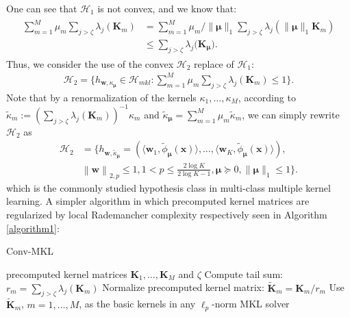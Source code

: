 \documentclass{article}
\begin{document}
One can see that $\mathcal{H}_{1}$ is not convex, and we know that:
\begin{align*}
    \begin{aligned}
        \sum_{m=1}^M\mu_m\sum_{j>\zeta}\lambda_{j}(\mathbf{K}_m)
        & =\sum_{m=1}^M\mu_m/\|\bm \mu\|_1 \sum_{j>\zeta}\lambda_{j}(\|\bm \mu\|_1\mathbf{K}_m)\\
        & \leq \sum_{j>\zeta} \lambda_j\big(\mathbf{K}_{\bm \mu}\big).
    \end{aligned}
\end{align*}
Thus, we consider the use of the convex $\mathcal{H}_2$ replace of $\mathcal{H}_1$:
\begin{align}
    \mathcal{H}_{2}=\Big\{h_{\mathbf{w}, \kappa_{\bm \mu}} \in \mathcal{H}_{mkl}:
    \sum_{m=1}^M\mu_m\sum_{j>\zeta}\lambda_{j}(\mathbf{K}_m) \leq 1\Big\}.
\end{align}
Note that by a renormalization of the kernels $\kappa_1,\ldots,\kappa_M$,
according to $\tilde{\kappa}_m:=\left(\sum_{j>\zeta}\lambda_j(\mathbf K_m)\right)^{-1}\kappa_m$
and $\tilde{\kappa}_{\bm \mu}=\sum_{m=1}^M\mu_m\tilde{\kappa}_m$,
we can simply rewrite $\mathcal{H}_2$ as
\begin{align*}
   \mathcal{H}_2&=\Big\{h_{\mathbf{w},\tilde{\kappa}_{\bm \mu}}=\left(\langle \mathbf w_1,\tilde{\phi}_{\bm \mu}(\mathbf x)\rangle,
   \ldots, \langle\mathbf w_K,\tilde{\phi}_{\bm \mu}(\mathbf x)\rangle\right),\\
   &\left\|\mathbf  w \right\|_{2,p}\leq 1, 1 < p \leq \frac{2\log K}{2\log K-1},
   \bm \mu\succeq 0,\|\bm \mu\|_1 \leq 1\Big\}.
\end{align*}
which is the commonly studied hypothesis class in multi-class multiple kernel learning.
A simpler algorithm in which precomputed kernel matrices
are regularized by local Rademancher complexity respectively seen in Algorithm  \ref{algorithm1}:
\begin{algorithm}[h]
   \caption{Conv-MKL}
   \label{algorithm1}
    \begin{algorithmic}
        precomputed kernel matrices $\mathbf{K}_1,\ldots,\mathbf{K}_M$ and $\zeta$
        \STATE Compute tail sum: $r_m=\sum_{j>\zeta}\lambda_j\left(\mathbf{K}_m\right)$
        \STATE Normalize precomputed kernel matrix: $\widetilde{\mathbf{K}}_m=\mathbf{K}_m/r_m$
       \ENDFOR
       \STATE Use $\widetilde{\mathbf{K}}_m$, $m=1,\ldots, M$, as the basic kernels in any $\ell_p$-norm MKL solver
    \end{algorithmic}
\end{algorithm}
\end{document}
